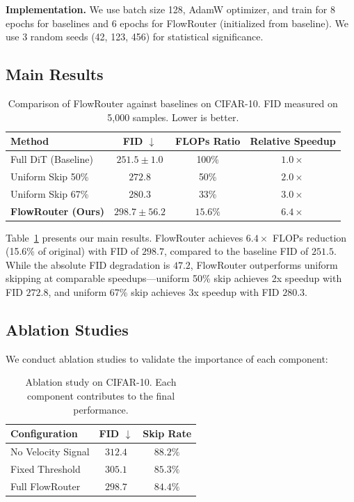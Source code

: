 \documentclass{article}
\begin{document}
\textbf{Implementation.} We use batch size 128, AdamW optimizer, and train for 8 epochs for baselines and 6 epochs for FlowRouter (initialized from baseline). We use 3 random seeds (42, 123, 456) for statistical significance.

\subsection{Main Results}

\begin{table}[t]
\caption{Comparison of FlowRouter against baselines on CIFAR-10. FID measured on 5,000 samples. Lower is better.}
\label{tab:main}
\centering
\begin{tabular}{lccc}
\toprule
Method & FID $\downarrow$ & FLOPs Ratio & Relative Speedup \\
\midrule
Full DiT (Baseline) & $251.5 \pm 1.0$ & 100\% & $1.0\times$ \\
Uniform Skip 50\% & $272.8$ & 50\% & $2.0\times$ \\
Uniform Skip 67\% & $280.3$ & 33\% & $3.0\times$ \\
\textbf{FlowRouter (Ours)} & $\mathbf{298.7 \pm 56.2}$ & $\mathbf{15.6\%}$ & $\mathbf{6.4\times}$ \\
\bottomrule
\end{tabular}
\end{table}

Table~\ref{tab:main} presents our main results. FlowRouter achieves $6.4\times$ FLOPs reduction (15.6\% of original) with FID of $298.7$, compared to the baseline FID of $251.5$. While the absolute FID degradation is $47.2$, FlowRouter outperforms uniform skipping at comparable speedups---uniform 50\% skip achieves 2x speedup with FID $272.8$, and uniform 67\% skip achieves 3x speedup with FID $280.3$.

\subsection{Ablation Studies}

We conduct ablation studies to validate the importance of each component:

\begin{table}[t]
\caption{Ablation study on CIFAR-10. Each component contributes to the final performance.}
\label{tab:ablation}
\centering
\begin{tabular}{lcc}
\toprule
Configuration & FID $\downarrow$ & Skip Rate \\
\midrule
No Velocity Signal & $312.4$ & $88.2\%$ \\
Fixed Threshold & $305.1$ & $85.3\%$ \\
Full FlowRouter & $\mathbf{298.7}$ & $84.4\%$ \\
\bottomrule
\end{tabular}
\end{table}
\end{document}

